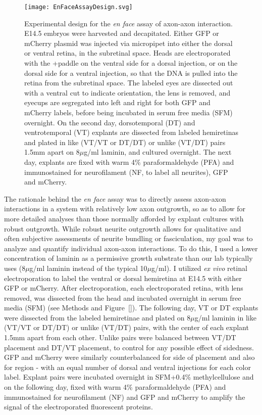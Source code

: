\begin{figure}[hbtp]
    \begin{center}
        \texttt{[image: EnFaceAssayDesign.svg]}
        \caption[Experimental design for the \emph{en face} assay of axon-axon interaction.]
        {Experimental design for the \emph{en face} assay of axon-axon interaction.
		E14.5 embryos were harvested and decapitated.
		Either GFP or mCherry plasmid was injected via micropipet into either the dorsal or ventral retina, in the subretinal space.
		Heads are electroporated with the +paddle on the ventral side for a dorsal injection, or on the dorsal side for a ventral injection, so that the DNA is pulled into the retina from the subretinal space.
		The labeled eyes are dissected out with a ventral cut to indicate orientation, the lens is removed, and eyecups are segregated into left and right for both GFP and mCherry labels, before being incubated in serum free media (SFM) overnight.
		On the second day, dorsotemporal (DT) and ventrotemporal (VT) explants are dissected from labeled hemiretinas and plated in like (VT/VT or DT/DT) or unlike (VT/DT) pairs 1.5mm apart on 8$\mu$g/ml laminin, and cultured overnight.
		The next day, explants are fixed with warm 4\% paraformaldehyde (PFA) and immunostained for neurofilament (NF, to label all neurites), GFP and mCherry.
		}
        \label{EnFaceAssayDesign}
    \end{center}
\end{figure}
The rationale behind the \emph{en face} assay was to directly assess axon-axon interactions in a system with relatively low axon outgrowth, so as to allow for more detailed analyses than those normally afforded by explant cultures with robust outgrowth.
While robust neurite outgrowth allows for qualitative and often subjective assessments of neurite bundling or fasciculation, my goal was to analyze and quantify individual axon-axon interactions.
To do this, I used a lower concentration of laminin as a permissive growth substrate than our lab typically uses (8$\mu$g/ml laminin instead of the typical 10$\mu$g/ml).
I utilized \emph{ex vivo} retinal electroporation \cite{petros2009utero} to label the ventral or dorsal hemiretina at E14.5 with either GFP or mCherry.
After electroporation, each electroporated retina, with lens removed, was dissected from the head and incubated overnight in serum free media (SFM) (see Methods and Figure~\ref{}).
The following day, VT or DT explants were dissected from the labeled hemiretinae and plated on 8$\mu$g/ml laminin in like (VT/VT or DT/DT) or unlike (VT/DT) pairs, with the center of each explant 1.5mm apart from each other.
Unlike pairs were balanced between VT/DT placement and DT/VT placement, to control for any possible effect of sidedness.
GFP and mCherry were similarly counterbalanced for side of placement and also for region - with an equal number of dorsal and ventral injections for each color label.
Explant pairs were incubated overnight in SFM+0.4\% methylcellulose and on the following day, fixed with warm 4\% paraformaldehyde (PFA) and immunostained for neurofilament (NF) and GFP and mCherry to amplify the signal of the electroporated fluorescent proteins.

